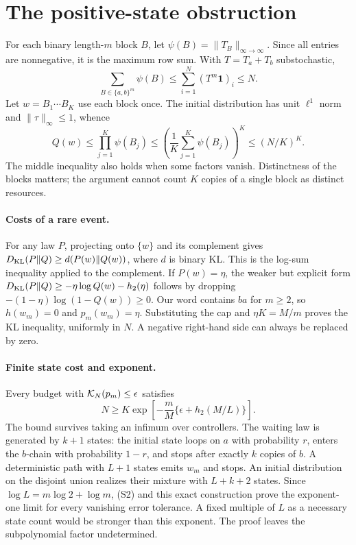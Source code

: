 \section{The positive-state obstruction}\label{app:kl}
For each binary length-\(m\) block \(B\), let \(\psi(B)=\|T_B\|_{\infty\to\infty}\). Since all entries are nonnegative, it is the maximum row sum. With \(T=T_a+T_b\) substochastic,
\[
 \sum_{B\in\{a,b\}^m}\psi(B)\le\sum_{i=1}^N(T^m\mathbf1)_i\le N.
\]
Let \(w=B_1\cdots B_K\) use each block once. The initial distribution has unit \(\ell^1\) norm and \(\|\tau\|_\infty\le1\), whence
\[
 Q(w)\le\prod_{j=1}^K\psi(B_j)
       \le\left(\frac{1}{K}\sum_{j=1}^K\psi(B_j)\right)^K
       \le (N/K)^K .
\]
The middle inequality also holds when some factors vanish. Distinctness of the blocks matters; the argument cannot count \(K\) copies of a single block as distinct resources.

\paragraph{Costs of a rare event.}
For any law \(P\), projecting onto \(\{w\}\) and its complement gives \(D_{\mathrm{KL}}(P\Vert Q)\ge d(P(w)\Vert Q(w))\), where \(d\) is binary KL. This is the log-sum inequality applied to the complement. If \(P(w)=\eta\), the weaker but explicit form \(D_{\mathrm{KL}}(P\Vert Q)\ge-\eta\log Q(w)-h_2(\eta)\) follows by dropping \(-(1-\eta)\log(1-Q(w))\ge0\). Our word contains \(ba\) for \(m\ge2\), so \(h(w_m)=0\) and \(p_m(w_m)=\eta\). Substituting the cap and \(\eta K=M/m\) proves the KL inequality, uniformly in \(N\). A negative right-hand side can always be replaced by zero.

\paragraph{Finite state cost and exponent.}
Every budget with \(\mathcal K_N(p_m)\le\epsilon\) satisfies
\[
 N\ge K\exp\!\left[-\frac mM\{\epsilon+h_2(M/L)\}\right].
 \tag{S2}
\]
The bound survives taking an infimum over controllers. The waiting law is generated by \(k+1\) states: the initial state loops on \(a\) with probability \(r\), enters the \(b\)-chain with probability \(1-r\), and stops after exactly \(k\) copies of \(b\). A deterministic path with \(L+1\) states emits \(w_m\) and stops. An initial distribution on the disjoint union realizes their mixture with \(L+k+2\) states. Since \(\log L=m\log2+\log m\), (S2) and this exact construction prove the exponent-one limit for every vanishing error tolerance. A fixed multiple of \(L\) as a necessary state count would be stronger than this exponent. The proof leaves the subpolynomial factor undetermined.

